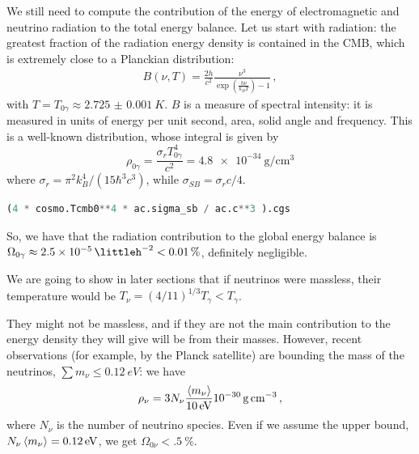 \documentclass[main.tex]{subfiles}
\begin{document}
We still need to compute the contribution of the energy of electromagnetic and neutrino radiation to the total energy balance.
Let us start with radiation: the greatest fraction of the radiation energy density is contained in the CMB, which is extremely close to a Planckian distribution: 
%
\begin{align}
B (\nu, T) = \frac{2 h}{c^2} \frac{\nu^3}{\exp(\frac{h \nu }{k_B T}) - 1}
\,,
\end{align}
%
with \(T = T_{0 \gamma } \approx \SI{2.725(1)}{K}\). \(B\) is a measure of spectral intensity: it is measured in units of energy per unit second, area, solid angle and frequency. This is a well-known distribution, whose integral is given by
%
\begin{equation}
  \rho_{0 \gamma} = \frac{\sigma_r T_{0 \gamma}^4}{c^2} = \SI{4.8e-34}{\gram\per\centi\metre\cubed}
\end{equation}
%
where \(\sigma_r = \pi^2 k_B^4 / (15 \hbar ^3 c^3)\), while \(\sigma_{SB} = \sigma_r c /4\).

\begin{lstlisting}[language=Python]
(4 * cosmo.Tcmb0**4 * ac.sigma_sb / ac.c**3 ).cgs
\end{lstlisting}

So, we have that the radiation contribution to the global energy balance is \(\Omega_{0 \gamma } \approx \SI{2.5e-5}{\littleh^{-2}} < \SI{.01}{\percent}\), definitely negligible.


We are going to show in later sections
that if neutrinos were massless, their temperature would be \(T_\nu = (4/11)^{1/3} T_\gamma < T_\gamma \).

They might not be massless, and if they are not the main contribution to the energy density they will give will be from their masses.
However, recent observations (for example, by the Planck satellite) are bounding the mass of the neutrinos,
\(\sum m_\nu \leq \SI{0.12}{eV} \): we have 
%
\begin{equation}
\rho_\nu = 3 N_\nu \frac{\expval{m_\nu} }{\SI{10}{eV}} \SI{e-30}{\gram\per\cubic\centi\metre}
\,,
\end{equation}
%
where \(N_{\nu }\) is the number of neutrino species. 
Even if we assume the upper bound, \(N_{\nu } \expval{m_{\nu }} = \SI{.12}{eV}\), we get \(\Omega_{0 \nu } < \SI{.5}{\percent}\). 
\end{document}
